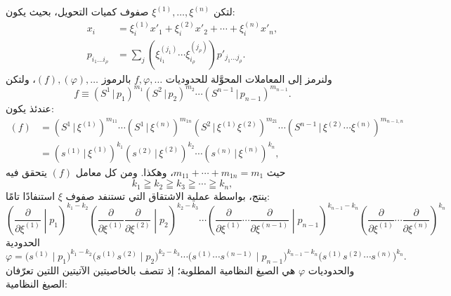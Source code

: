 \documentclass[11pt]{article}
\providecommand{\pair}[2]{(#1\,|\,#2)}
\begin{document}
لتكن $\xi^{(1)},\ldots,\xi^{(n)}$ صفوف كميات التحويل، بحيث يكون:
\begin{equation}
\begin{aligned}
x_i&=\xi_i^{(1)}x'_1+\xi_i^{(2)}x'_2+\cdots+\xi_i^{(n)}x'_n,\\
p_{i_1\ldots i_\rho}&=\sum_j(\xi_{i_1}^{(j_1)}\cdots \xi_{i_\rho}^{(j_\rho)})p'_{j_1\ldots j_\rho}.
\end{aligned}
\tag{47}
\end{equation}
ولنرمز إلى المعاملات المحوَّلة للحدوديات $f,\varphi,\ldots$ بالرموز $(f),(\varphi),\ldots$، ولتكن
\[
 f\equiv\pair{S^1}{p_1}^{m_1}\pair{S^2}{p_2}^{m_2}\cdots\pair{S^{n-1}}{p_{n-1}}^{m_{n-1}}.
\]
عندئذ يكون:
\begin{equation}
\begin{aligned}
(f)&=\pair{S^1}{\xi^{(1)}}^{m_{11}}\cdots\pair{S^1}{\xi^{(n)}}^{m_{1n}}
\pair{S^2}{\xi^{(1)}\xi^{(2)}}^{m_{21}}\cdots
\pair{S^{n-1}}{\xi^{(2)}\cdots\xi^{(n)}}^{m_{n-1,n}}\\
&=\pair{s^{(1)}}{\xi^{(1)}}^{k_1}\pair{s^{(2)}}{\xi^{(2)}}^{k_2}\cdots\pair{s^{(n)}}{\xi^{(n)}}^{k_n},
\end{aligned}
\tag{48}
\end{equation}
حيث $m_{11}+\cdots+m_{1n}=m_1$، وهكذا. ومن كل معامل $(f)$ يتحقق فيه
\begin{equation}
 k_1\geqq k_2\geqq k_3\geqq\cdots\geqq k_n,
\tag{49}
\end{equation}
ينتج، بواسطة عملية الاشتقاق التي تستنفد صفوف $\xi$ استنفادًا تامًا:
\begin{equation}
\left(\frac{\partial}{\partial\xi^{(1)}}\middle|p_1\right)^{k_1-k_2}
\left(\frac{\partial}{\partial\xi^{(1)}}\frac{\partial}{\partial\xi^{(2)}}\middle|p_2\right)^{k_2-k_3}
\cdots
\left(\frac{\partial}{\partial\xi^{(1)}}\cdots\frac{\partial}{\partial\xi^{(n-1)}}\middle|p_{n-1}\right)^{k_{n-1}-k_n}
\left(\frac{\partial}{\partial\xi^{(1)}}\cdots\frac{\partial}{\partial\xi^{(n)}}\right)^{k_n}
\tag{50}
\end{equation}
الحدودية
\begin{equation}
 \varphi=\bigl(s^{(1)}\mid p_1\bigr)^{k_1-k_2}
 \bigl(s^{(1)}s^{(2)}\mid p_2\bigr)^{k_2-k_3}\cdots
 \bigl(s^{(1)}\cdots s^{(n-1)}\mid p_{n-1}\bigr)^{k_{n-1}-k_n}
 \bigl(s^{(1)}s^{(2)}\cdots s^{(n)}\bigr)^{k_n}.
\tag{51}
\end{equation}
والحدوديات $\varphi$ هي الصيغ النظامية المطلوبة؛ إذ تتصف بالخاصيتين الآتيتين اللتين تعرّفان الصيغ النظامية:
\end{document}
